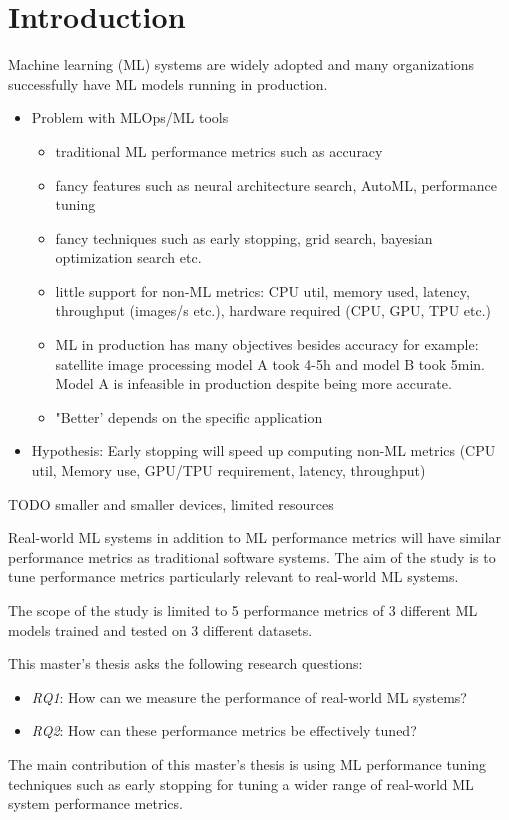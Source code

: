 \chapter{Introduction}

Machine learning (ML) systems are widely adopted and many organizations successfully have ML models running in production.

\begin{itemize}
    \item Problem with MLOps/ML tools
        \begin{itemize}
            \item traditional ML performance metrics such as accuracy
            \item fancy features such as neural architecture search, AutoML, performance tuning
            \item fancy techniques such as early stopping, grid search, bayesian optimization search etc.
            \item little support for non-ML metrics: CPU util, memory used, latency, throughput (images/s etc.), hardware required (CPU, GPU, TPU etc.)
            \item ML in production has many objectives besides accuracy for example: satellite image processing model A took 4-5h and model B took 5min. Model A is infeasible in production despite being more accurate.
            \item "Better' depends on the specific application
        \end{itemize}
    \item Hypothesis: Early stopping will speed up computing non-ML metrics (CPU util, Memory use, GPU/TPU requirement, latency, throughput)
\end{itemize}

TODO smaller and smaller devices, limited resources

Real-world ML systems in addition to ML performance metrics will have similar performance metrics as traditional software systems. The aim of the study is to tune performance metrics particularly relevant to real-world ML systems. 

The scope of the study is limited to 5 performance metrics of 3 different ML models trained and tested on 3 different datasets.

This master's thesis asks the following research questions:
\begin{itemize}
    \item \emph{RQ1}: How can we measure the performance of real-world ML systems?
    \item \emph{RQ2}: How can these performance metrics be effectively tuned?
\end{itemize}

The main contribution of this master's thesis is using ML performance tuning techniques such as early stopping for tuning a wider range of real-world ML system performance metrics.